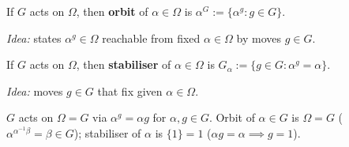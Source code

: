 \begin{slide}
\begin{example}
\begin{center}
        \end{center}
    \end{example}
\end{slide}

\begin{slide}
    \begin{definition}[orbit]
        \vspace{0pt}
        If $G$ acts on $\Omega$, then \textbf{orbit} of $\alpha \in \Omega$ is $\alpha^G := \{\alpha^g : g \in G\}$.
    \end{definition}

    \textit{Idea:} states $\alpha^g \in \Omega$ reachable from fixed $\alpha \in \Omega$ by moves $g \in G$. \pause

    \begin{definition}[stabiliser]
        \vspace{0pt}
        If $G$ acts on $\Omega$, then \textbf{stabiliser} of $\alpha \in \Omega$ is $G_\alpha := \{g \in G : \alpha^g = \alpha\}$.
    \end{definition}

    \textit{Idea:} moves $g \in G$ that fix given $\alpha \in \Omega$. \pause

    \begin{example}
        \vspace{0pt}
        $G$ acts on $\Omega = G$ via $\alpha^g = \alpha g$ for $\alpha,g \in G$. Orbit of $\alpha \in G$ is \pause $\Omega = G$ ($\alpha^{\alpha^{-1}\beta} = \beta \in G$); stabiliser of $\alpha$ is \pause $\{1\} = 1$ ($\alpha g = \alpha \implies g = 1$).
    \end{example}
\end{slide}

